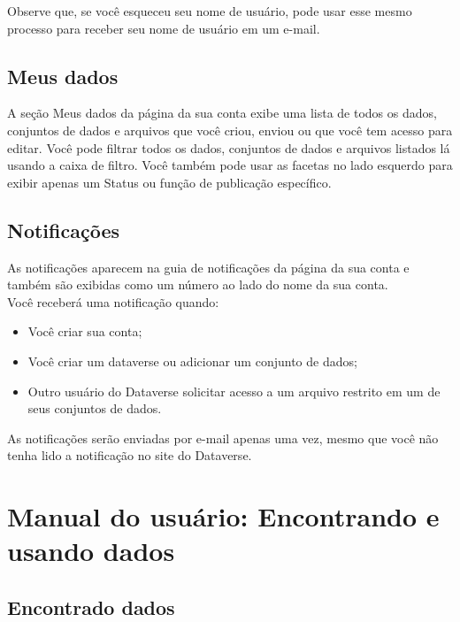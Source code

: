 \documentclass[12pt,hidelinks]{article}
\begin{document}
Observe que, se você esqueceu seu nome de usuário, pode usar esse mesmo processo para receber seu nome de usuário em um e-mail.
     	
    \subsection{Meus dados}
     	
\qquad A seção Meus dados da página da sua conta exibe uma lista de todos os dados, conjuntos de dados e arquivos que você criou, enviou ou que você tem acesso para editar. Você pode filtrar todos os dados, conjuntos de dados e arquivos listados lá usando a caixa de filtro. Você também pode usar as facetas no lado esquerdo para exibir apenas um Status ou função de publicação específico.
     	
    \subsection{Notificações}
     	
\qquad As notificações aparecem na guia de notificações da página da sua conta e também são exibidas como um número ao lado do nome da sua conta.\\

Você receberá uma notificação quando:

\begin{itemize} 
\item Você criar sua conta;
\item Você criar um dataverse ou adicionar um conjunto de dados;
\item Outro usuário do Dataverse solicitar acesso a um arquivo restrito em um de seus conjuntos de dados.
\end{itemize}	

As notificações serão enviadas por e-mail apenas uma vez, mesmo que você não tenha lido a notificação no site do Dataverse.

\newpage
     	
\section{Manual do usuário: Encontrando e usando dados}
\vspace{10.5cm}

	\subsection{Encontrado dados}
	
\end{document}
